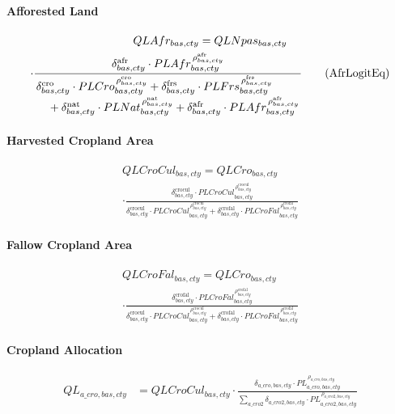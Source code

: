 \paragraph{Afforested Land}
\begin{multline}
  QLAfr_{bas,cty} = QLNpas_{bas,cty}\\
  \cdot
  \frac{
    \delta^{\text{afr}}_{bas,cty} \cdot PLAfr_{bas,cty}^{\,\rho^{\text{afr}}_{bas,cty}}
  }{
    \splitfrac{\delta^{\text{cro}}_{bas,cty} \cdot PLCro_{bas,cty}^{\,\rho^{\text{cro}}_{bas,cty}}
    + \delta^{\text{frs}}_{bas,cty} \cdot PLFrs_{bas,cty}^{\,\rho^{\text{frs}}_{bas,cty}}}
    {+ \delta^{\text{nat}}_{bas,cty} \cdot PLNat_{bas,cty}^{\,\rho^{\text{nat}}_{bas,cty}}
    + \delta^{\text{afr}}_{bas,cty} \cdot PLAfr_{bas,cty}^{\,\rho^{\text{afr}}_{bas,cty}}}
  }
  \tag{AfrLogitEq}\label{eq:AfrLogitEq}
\end{multline}

\paragraph{Harvested Cropland Area}
\begin{multline}
  QLCroCul_{bas,cty} = QLCro_{bas,cty}\\
  \cdot
  \frac{
    \delta^{\text{crocul}}_{bas,cty}\cdot PLCroCul_{bas,cty}^{\,\rho^{\text{crocul}}_{bas,cty}}
  }{
    \delta^{\text{crocul}}_{bas,cty}\cdot PLCroCul_{bas,cty}^{\,\rho^{\text{crocul}}_{bas,cty}}
    + \delta^{\text{crofal}}_{bas,cty}\cdot PLCroFal_{bas,cty}^{\,\rho^{\text{crofal}}_{bas,cty}}
  }
  \tag{CroCulLogitEq}\label{eq:CroCulLogitEq}
\end{multline}

\paragraph{Fallow Cropland Area}
\begin{multline}
  QLCroFal_{bas,cty} = QLCro_{bas,cty}\\
  \cdot
  \frac{
    \delta^{\text{crofal}}_{bas,cty}\cdot PLCroFal_{bas,cty}^{\,\rho^{\text{crofal}}_{bas,cty}}
  }{
    \delta^{\text{crocul}}_{bas,cty}\cdot PLCroCul_{bas,cty}^{\,\rho^{\text{crocul}}_{bas,cty}}
    + \delta^{\text{crofal}}_{bas,cty}\cdot PLCroFal_{bas,cty}^{\,\rho^{\text{crofal}}_{bas,cty}}
  }
  \tag{CroFalLogitEq}\label{eq:CroFalLogitEq}
\end{multline}


\paragraph{Cropland Allocation}
\begin{align}
  QL_{a\_cro,bas,cty}
  &= QLCroCul_{bas,cty}
     \cdot
     \frac{
       \delta_{a\_cro,bas,cty}\cdot PL_{a\_cro,bas,cty}^{\,\rho_{a\_cro,bas,cty}}
     }{
       \sum_{a\_cro2}\delta_{a\_cro2,bas,cty}\cdot PL_{a\_cro2,bas,cty}^{\,\rho_{a\_cro2,bas,cty}}
     }
  \tag{CroDistEq}\label{eq:CroDistEq}
\end{align}

